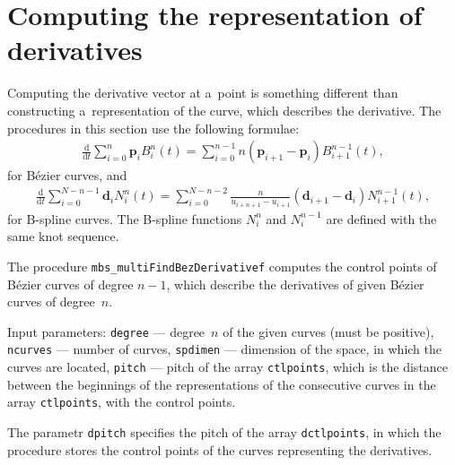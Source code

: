 \newpage
\section{Computing the representation of derivatives}

Computing the derivative vector at a~point is something different than
constructing a~representation of the curve, which describes the derivative.
The procedures in this section use the following formulae:
\begin{align}
  \frac{\mathrm{d}}{\mathrm{d}t}\sum_{i=0}^n\bm{p}_iB^n_i(t) =
  \sum_{i=0}^{n-1}n(\bm{p}_{i+1}-\bm{p}_i)B^{n-1}_{i+1}(t),
\end{align}
for B\'{e}zier curves, and
\begin{align}
  \frac{\mathrm{d}}{\mathrm{d}t}\sum_{i=0}^{N-n-1}\bm{d}_iN^n_i(t) =
  \sum_{i=0}^{N-n-2}\frac{n}{u_{i+n+1}-u_{i+1}}(\bm{d}_{i+1}-\bm{d}_i)
  N^{n-1}_{i+1}(t),
\end{align}
for B-spline curves. The B-spline functions $N^n_i$ and $N^{n-1}_i$ are
defined with the same knot sequence.

\vspace{\bigskipamount}
The procedure \texttt{mbs\_multiFindBezDerivativef} computes the control
points of B\'{e}zier curves of degree $n-1$, which describe the derivatives
of given B\'{e}zier curves of degree~$n$.

\begin{sloppypar}
Input parameters: \texttt{degree} --- degree~$n$ of the given curves (must
be positive),
\texttt{ncurves} --- number of curves, \texttt{spdimen} --- dimension of
the space, in which the curves are located, \texttt{pitch} --- pitch of the
array \texttt{ctlpoints}, which is the distance between the beginnings of
the representations of the consecutive curves in the array
\texttt{ctlpoints}, with the control points.
\end{sloppypar}

The parametr \texttt{dpitch} specifies the pitch of the array
\texttt{dctlpoints}, in which the procedure stores the control points
of the curves representing the derivatives.

